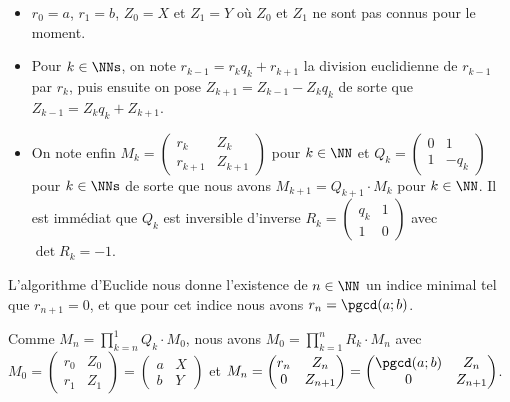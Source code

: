 \begin{itemize}[label=\small\textbullet]
	\item $r_0 = a$, $r_1 = b$, $Z_0 = X$ et $Z_1 = Y$ où $Z_0$ et $Z_1$ ne sont pas connus pour le moment.

	\item Pour $k \in \NNs$, on note $r_{k-1} = r_k q_k + r_{k+1}$ la division euclidienne de $r_{k-1}$ par $r_k$, puis ensuite on pose $Z_{k+1} = Z_{k-1} - Z_k q_k$ de sorte que $Z_{k-1} = Z_k q_k + Z_{k+1}$.

	\item On note enfin
	      $M_k 
           =
           \begin{pmatrix}
          	  r_k     & Z_k     \\ 
          	  r_{k+1} & Z_{k+1}
           \end{pmatrix}$
          pour $k \in \NN$ et
	      $Q_k 
           =
           \begin{pmatrix}
          	  0 & 1     \\ 
          	  1 & - q_k
           \end{pmatrix}$
          pour $k \in \NNs$ de sorte que nous avons $M_{k+1} = Q_{k+1} \cdot M_k$ pour $k \in \NN$. Il est immédiat que $Q_k$ est inversible d'inverse
	      $R_k 
           =
           \begin{pmatrix}
          	  q_k & 1 \\ 
          	  1   & 0
           \end{pmatrix}$
          avec $\det R_k = -1$.
\end{itemize}


L'algorithme d'Euclide nous donne l'existence de $n \in \NN$ un indice minimal tel que $r_{n+1} = 0$, et que pour cet indice nous avons $r_n = \pgcd(a ; b)$.


Comme
$\displaystyle M_n = \prod_{k = n}^{1} Q_k \cdot M_0$,
nous avons
$\displaystyle M_0 = \prod_{k = 1}^{n} R_k \cdot M_n$
avec
$M_0
 =
 \begin{pmatrix}
    r_0 & Z_0 \\ 
    r_1 & Z_1
 \end{pmatrix}
 =
 \begin{pmatrix}
    a & X \\ 
    b & Y
 \end{pmatrix}$
et
$M_n
 =
 \begin{pmatrix}
    r_n & Z_n     \\ 
    0   & Z_{n+1}
 \end{pmatrix}
 =
 \begin{pmatrix}
    \pgcd(a ; b) & Z_n     \\ 
    0            & Z_{n+1}
 \end{pmatrix}$.
 

